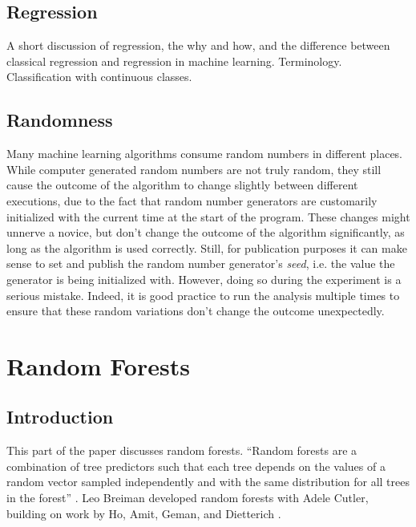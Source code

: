 \documentclass[a4paper,man,12pt,apacite,floatsintext,draftfirst]{apa6} %
\begin{document}
\subsection{Regression}
A short discussion of regression, the why and how, and the difference
between classical regression and regression in machine learning.
Terminology. Classification with continuous classes.

\subsection{Randomness}
Many machine learning algorithms consume random numbers in different places.
While computer generated random numbers are not truly random, they still
cause the outcome of the algorithm to change slightly between different
executions, due to the fact that random number generators are customarily
initialized with the current time at the start of the program.
These changes might unnerve a novice, but don't change the outcome of the
algorithm significantly, as long as the algorithm is used correctly.
Still, for publication purposes it can make sense to set and publish the
random number generator's \emph{seed}, i.e. the value the generator is being
initialized with.
However, doing so during the experiment
is a serious mistake.
Indeed, it is good practice to run the analysis multiple times to ensure
that these random variations don't change the outcome unexpectedly.

\newpage
\section{Random Forests}

\subsection{Introduction}
This part of the paper discusses random forests.
“Random forests are a combination of tree predictors such that each tree
depends on the values of a random vector sampled independently and with
the same distribution for all trees in the forest” \cite{breiman2001random}.
Leo Breiman developed random forests with Adele Cutler, building on work
by Ho, Amit, Geman, and Dietterich \cite{wpRF}.
\end{document}
